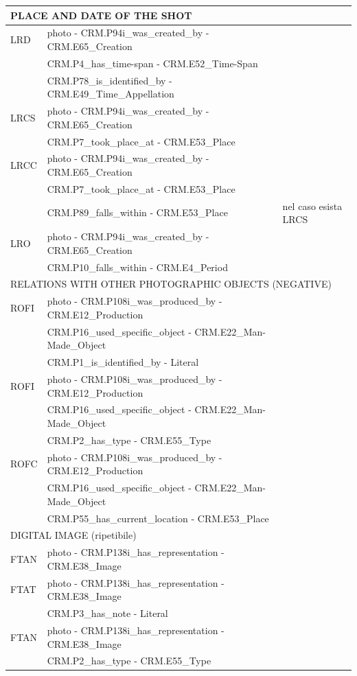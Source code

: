 \begin{center}
\begin{longtable}{ | p{1cm} | p{8cm} | p{3cm} | }
  \multicolumn{3}{|l|}{\cellcolor{lightcyan}PLACE AND DATE OF THE SHOT}\\ \hline
  LRD &  photo - CRM.P94i\_was\_created\_by - CRM.E65\_Creation & \\
   & CRM.P4\_has\_time-span - CRM.E52\_Time-Span & \\ 
   & CRM.P78\_is\_identified\_by - CRM.E49\_Time\_Appellation & \\ \hline
  LRCS &  photo - CRM.P94i\_was\_created\_by - CRM.E65\_Creation & \\
   & CRM.P7\_took\_place\_at - CRM.E53\_Place & \\ \hline
  LRCC &  photo - CRM.P94i\_was\_created\_by - CRM.E65\_Creation & \\
   & CRM.P7\_took\_place\_at - CRM.E53\_Place & \\
   & CRM.P89\_falls\_within - CRM.E53\_Place & nel caso esista LRCS \\ \hline
  LRO &  photo - CRM.P94i\_was\_created\_by - CRM.E65\_Creation & \\
   & CRM.P10\_falls\_within - CRM.E4\_Period & \\ \hline
  
  \multicolumn{3}{|l|}{\cellcolor{lightcyan}RELATIONS WITH OTHER PHOTOGRAPHIC OBJECTS (NEGATIVE)}\\ \hline
  ROFI &  photo - CRM.P108i\_was\_produced\_by - CRM.E12\_Production & \\
   & CRM.P16\_used\_specific\_object - CRM.E22\_Man-Made\_Object & \\
   & CRM.P1\_is\_identified\_by - Literal & \\ \hline
  ROFI &  photo - CRM.P108i\_was\_produced\_by - CRM.E12\_Production & \\
   & CRM.P16\_used\_specific\_object - CRM.E22\_Man-Made\_Object & \\
   & CRM.P2\_has\_type - CRM.E55\_Type & \\ \hline
  ROFC &  photo - CRM.P108i\_was\_produced\_by - CRM.E12\_Production & \\
   & CRM.P16\_used\_specific\_object - CRM.E22\_Man-Made\_Object & \\
   & CRM.P55\_has\_current\_location - CRM.E53\_Place & \\ \hline
  
  \multicolumn{3}{|l|}{\cellcolor{lightcyan}DIGITAL IMAGE (ripetibile)}\\ \hline
  FTAN &  photo - CRM.P138i\_has\_representation - CRM.E38\_Image & \\ \hline
  FTAT &  photo - CRM.P138i\_has\_representation - CRM.E38\_Image & \\
   & CRM.P3\_has\_note - Literal & \\ \hline
  FTAN &  photo - CRM.P138i\_has\_representation - CRM.E38\_Image & \\
   & CRM.P2\_has\_type - CRM.E55\_Type & \\ \hline
  

\end{longtable}
\end{center}
